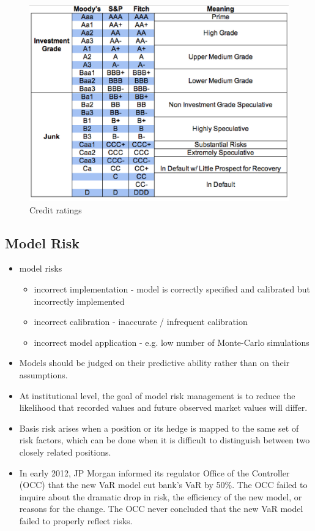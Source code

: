 \begin{figure}[htp]
\centering
\includegraphics[scale = 0.50]{credit_ratings.eps}
\caption{Credit ratings}
\label{credit_ratings}
\end{figure}

\subsection{Model Risk}
\begin{itemize}
	\item model risks
	\begin{itemize}
		\item incorrect implementation - model is correctly specified and calibrated but incorrectly implemented
		\item incorrect calibration - inaccurate / infrequent calibration
		\item incorrect model application - e.g. low number of Monte-Carlo simulations
	\end{itemize}
	\item Models should be judged on their predictive ability rather than on their assumptions.
	\item At institutional level, the goal of model risk management is to reduce the likelihood that recorded values and future observed market values will differ.
	\item Basis risk arises when a position or its hedge is mapped to the same set of risk factors, which can be done when it is difficult to distinguish between two closely related positions.
	\item In early 2012, JP Morgan informed its regulator Office of the Controller (OCC) that the new VaR model cut bank's VaR by 50\%. The OCC failed to inquire about the dramatic drop in risk, the efficiency of the new model, or reasons for the change. The OCC never concluded that the new VaR model failed to properly reflect risks.
\end{itemize}


